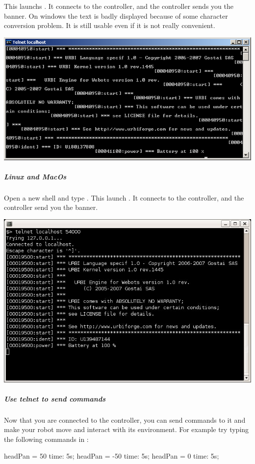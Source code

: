This launchs . It connects to the \urbi controller,
and the \urbi controller sends you the \urbi banner. On windows the
text is badly displayed because of some character conversion
problem. It is still usable even if it is not really convenient.

\begin{center}
  \includegraphics[width=.8\linewidth]{img/webots/telnet-urbi-windows}
\end{center}

\subparagraph{Linux and MacOs}

Open a new shell and type .  This
launch . It connects to the \urbi controller, and the
\urbi controller send you the \urbi banner.

\begin{center}
  \includegraphics[width=.8\linewidth]{img/webots/telnet-urbi-linux}
\end{center}

\subparagraph{Use telnet to send commands}

Now that you are connected to the \urbi controller, you can send
commands to it and make your robot move and interact with its
environment. For example try typing the following commands in
:

\begin{urbiunchecked}
headPan = 50 time: 5s;
headPan = -50 time: 5s;
headPan = 0 time: 5s;
\end{urbiunchecked}

